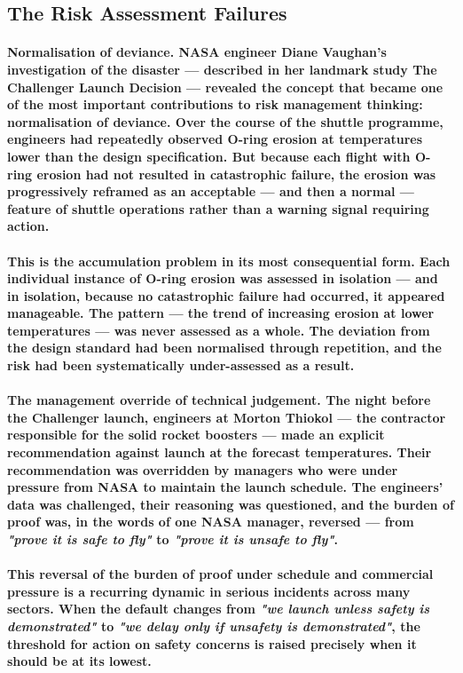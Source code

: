 \subsection{The Risk Assessment Failures}
\paragraph{\textbf{Normalisation of deviance}. NASA engineer Diane Vaughan's investigation of the disaster — described in her landmark study The Challenger Launch Decision — revealed the concept that became one of the most important contributions to risk management thinking: normalisation of deviance. Over the course of the shuttle programme, engineers had repeatedly observed O-ring erosion at temperatures lower than the design specification. But because each flight with O-ring erosion had not resulted in catastrophic failure, the erosion was progressively reframed as an acceptable — and then a normal — feature of shuttle operations rather than a warning signal requiring action.}
\paragraph{This is the accumulation problem in its most consequential form. Each individual instance of O-ring erosion was assessed in isolation — and in isolation, because no catastrophic failure had occurred, it appeared manageable. The pattern — the trend of increasing erosion at lower temperatures — was never assessed as a whole. The deviation from the design standard had been normalised through repetition, and the risk had been systematically under-assessed as a result.}
\paragraph{\textbf{The management override of technical judgement}. The night before the Challenger launch, engineers at Morton Thiokol — the contractor responsible for the solid rocket boosters — made an explicit recommendation against launch at the forecast temperatures. Their recommendation was overridden by managers who were under pressure from NASA to maintain the launch schedule. The engineers' data was challenged, their reasoning was questioned, and the burden of proof was, in the words of one NASA manager, reversed — from \textit{"prove it is safe to fly"} to \textit{"prove it is unsafe to fly"}.}
\paragraph{This reversal of the burden of proof under schedule and commercial pressure is a recurring dynamic in serious incidents across many sectors. When the default changes from \textit{"we launch unless safety is demonstrated"} to \textit{"we delay only if unsafety is demonstrated"}, the threshold for action on safety concerns is raised precisely when it should be at its lowest.}
